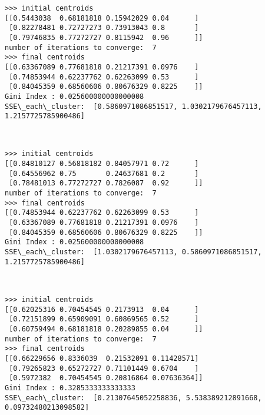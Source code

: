 \documentclass[11pt]{article}
\begin{document}
    \begin{Verbatim}[commandchars=\\\{\}]
>>> initial centroids
[[0.5443038  0.68181818 0.15942029 0.04      ]
 [0.82278481 0.72727273 0.73913043 0.8       ]
 [0.79746835 0.77272727 0.8115942  0.96      ]]
number of iterations to converge:  7
>>> final centroids
[[0.63367089 0.77681818 0.21217391 0.0976    ]
 [0.74853944 0.62237762 0.62263099 0.53      ]
 [0.84045359 0.68560606 0.80676329 0.8225    ]]
Gini Index : 0.025600000000000008
SSE\_each\_cluster:  [0.5860971086851517, 1.0302179676457113, 1.2157725785900486]

    \end{Verbatim}

    \begin{center}
    \end{center}
    { \hspace*{\fill} \\}
    
    \begin{Verbatim}[commandchars=\\\{\}]
>>> initial centroids
[[0.84810127 0.56818182 0.84057971 0.72      ]
 [0.64556962 0.75       0.24637681 0.2       ]
 [0.78481013 0.77272727 0.7826087  0.92      ]]
number of iterations to converge:  7
>>> final centroids
[[0.74853944 0.62237762 0.62263099 0.53      ]
 [0.63367089 0.77681818 0.21217391 0.0976    ]
 [0.84045359 0.68560606 0.80676329 0.8225    ]]
Gini Index : 0.025600000000000008
SSE\_each\_cluster:  [1.0302179676457113, 0.5860971086851517, 1.2157725785900486]

    \end{Verbatim}

    \begin{center}
    \end{center}
    { \hspace*{\fill} \\}
    
    \begin{Verbatim}[commandchars=\\\{\}]
>>> initial centroids
[[0.62025316 0.70454545 0.2173913  0.04      ]
 [0.72151899 0.65909091 0.60869565 0.52      ]
 [0.60759494 0.68181818 0.20289855 0.04      ]]
number of iterations to converge:  7
>>> final centroids
[[0.66229656 0.8336039  0.21532091 0.11428571]
 [0.79265823 0.65272727 0.71101449 0.6704    ]
 [0.5972382  0.70454545 0.20816864 0.07636364]]
Gini Index : 0.3285333333333333
SSE\_each\_cluster:  [0.21307645052258836, 5.538389212891668, 0.09732480213098582]

    \end{Verbatim}
\end{document}
